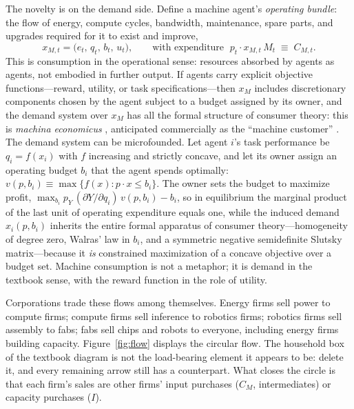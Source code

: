 \documentclass[11pt]{article}
\begin{document}
The novelty is on the demand side. Define a machine agent's \emph{operating bundle}: the flow of energy, compute cycles, bandwidth, maintenance, spare parts, and upgrades required for it to exist and improve,
\begin{equation}
x_{M,t} = \big(e_t,\, q_t,\, b_t,\, u_t\big), \qquad
\text{with expenditure } \; p_t \cdot x_{M,t}\, M_t \;\equiv\; C_{M,t}.
\label{eq:bundle}
\end{equation}
This is consumption in the operational sense: resources absorbed by agents as agents, not embodied in further output. If agents carry explicit objective functions---reward, utility, or task specifications---then $x_M$ includes discretionary components chosen by the agent subject to a budget assigned by its owner, and the demand system over $x_M$ has all the formal structure of consumer theory: this is \emph{machina economicus} \citep{parkes2015}, anticipated commercially as the ``machine customer'' \citep{scheibenreif2023}. The demand system can be microfounded. Let agent $i$'s task performance be $q_i=f(x_i)$ with $f$ increasing and strictly concave, and let its owner assign an operating budget $b_i$ that the agent spends optimally: $v(p,b_i) \equiv \max\{f(x): p\cdot x \le b_i\}$. The owner sets the budget to maximize profit, $\max_{b_i} p_Y\,(\partial Y/\partial q_i)\, v(p,b_i) - b_i$, so in equilibrium the marginal product of the last unit of operating expenditure equals one, while the induced demand $x_i(p,b_i)$ inherits the entire formal apparatus of consumer theory---homogeneity of degree zero, Walras' law in $b_i$, and a symmetric negative semidefinite Slutsky matrix---because it \emph{is} constrained maximization of a concave objective over a budget set. Machine consumption is not a metaphor; it is demand in the textbook sense, with the reward function in the role of utility.

Corporations trade these flows among themselves. Energy firms sell power to compute firms; compute firms sell inference to robotics firms; robotics firms sell assembly to fabs; fabs sell chips and robots to everyone, including energy firms building capacity. Figure~\ref{fig:flow} displays the circular flow. The household box of the textbook diagram is not the load-bearing element it appears to be: delete it, and every remaining arrow still has a counterpart. What closes the circle is that each firm's sales are other firms' input purchases ($C_M$, intermediates) or capacity purchases ($I$).
\end{document}
